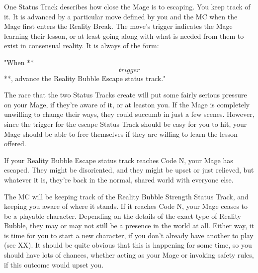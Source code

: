 \documentclass[
  oneside,
  statementpaper,
  9pt]{memoir}
\begin{document}
\begin{Player}

One Status Track describes how close the Mage is to escaping. You keep track of it. It is advanced by a particular move defined by you and the MC when the Mage first enters the Reality Break. The move’s trigger indicates the Mage learning their lesson, or at least going along with what is needed from them to exist in consensual reality. It is always of the form:

"When **\[trigger\]**, advance the Reality Bubble Escape status track."

The race that the two Status Tracks create will put some fairly serious pressure on your Mage, if they’re aware of it, or at leaston you. If the Mage is completely unwilling to change their ways, they could succumb in just a few scenes. However, since the trigger for the escape Status Track should be easy for you to hit, your Mage should be able to free themselves if they are willing to learn the lesson offered.

If your Reality Bubble Escape status track reaches Code N, your Mage has escaped. They might be disoriented, and they might be upset or just relieved, but whatever it is, they're back in the normal, shared world with everyone else.

The MC will be keeping track of the Reality Bubble Strength Status Track, and keeping you aware of where it stands. If it reaches Code N, your Mage ceases to be a playable character. Depending on the details of the exact type of Reality Bubble, they may or may not still be a presence in the world at all. Either way, it is time for you to start a new character, if you don't already have another to play (see XX). It should be quite obvious that this is happening for some time, so you should have lots of chances, whether acting as your Mage or invoking safety rules, if this outcome would upset you.

\end{Player}
\end{document}
